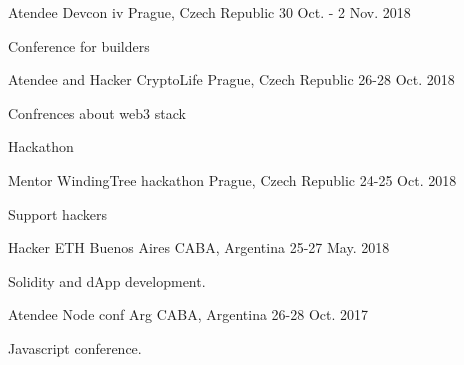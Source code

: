 \begin{cventries}
{}
\cventry
{Atendee} %
{Devcon iv} %
{Prague, Czech Republic} %
{30 Oct. - 2 Nov. 2018} %
{ %
\begin{cvitems}
\item {Conference for builders}
\end{cvitems}
}
\cventry
{Atendee and Hacker} %
{CryptoLife} %
{Prague, Czech Republic} %
{26-28 Oct. 2018} %
{ %
\begin{cvitems}
\item {Confrences about web3 stack}
\item {Hackathon}
\end{cvitems}
}
\cventry
{Mentor} %
{WindingTree hackathon} %
{Prague, Czech Republic} %
{24-25 Oct. 2018} %
{ %
\begin{cvitems}
\item {Support hackers}
\end{cvitems}
}
\cventry
{Hacker} %
{ETH Buenos Aires} %
{CABA, Argentina} %
{25-27 May. 2018} %
{ %
\begin{cvitems}
\item {Solidity and dApp development.}
\end{cvitems}
}
\cventry
{Atendee} %
{Node conf Arg} %
{CABA, Argentina} %
{26-28 Oct. 2017} %
{ %
\begin{cvitems}
\item {Javascript conference.}
\end{cvitems}
}
\end{cventries}
